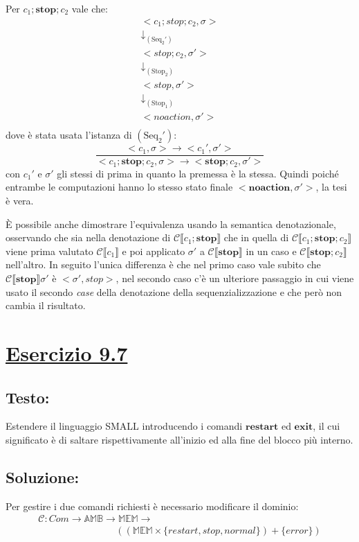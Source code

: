 \documentclass[a4paper,twosides]{report}
\newcommand{\sectionline}{
  \begin{center}
    \resizebox{0.5\linewidth}{5ex}{
      \begin{tikzpicture}
        \node  (C) at (0,0) {};
        \node (D) at (10,0) {};
        \path (C) to [ornament=84] (D);
      \end{tikzpicture}
    }
  \end{center}
}
\begin{document}
Per $c_1;\mathbf{stop};c_2$ vale che:
\begin{gather*}
  <c_1;stop;c_2,\sigma>\\
  \downarrow_{(\text{Seq}_2')}\\
  <stop;c_2,\sigma'>\\
  \downarrow_{(\text{Stop}_2)}\\
  <stop,\sigma'>\\
  \downarrow_{(\text{Stop}_1)}\\
  <noaction,\sigma'>\\
\end{gather*}
dove \`e stata usata l'istanza di $(\text{Seq}_2')$:
$$
\frac{<c_1,\sigma> \longrightarrow{}
  <c_1',\sigma'>}{<c_1;\mathbf{stop};c_2,\sigma> \longrightarrow{}
  <\mathbf{stop};c_2,\sigma'>}
$$
con $c_1'$ e $\sigma'$ gli stessi di prima in quanto la premessa è la
stessa. Quindi poich\'e entrambe le computazioni hanno lo stesso stato
finale $<\mathbf{noaction},\sigma'>$, la tesi
\`e vera.

\`E possibile anche dimostrare l'equivalenza usando la semantica
denotazionale, osservando che sia nella denotazione di $\mathcal{C}\llbracket
c_1;\mathbf{stop}\rrbracket$ che in quella di $\mathcal{C}\llbracket
c_1;\mathbf{stop};c_2\rrbracket$ viene prima valutato $\mathcal{C}\llbracket
c_1\rrbracket$ e poi applicato $\sigma'$ a $\mathcal{C}\llbracket
\mathbf{stop}\rrbracket$ in un caso e $\mathcal{C}\llbracket
\mathbf{stop};c_2\rrbracket$ nell'altro. In seguito l'unica differenza
\`e che nel primo caso vale subito che $\mathcal{C}\llbracket
\mathbf{stop}\rrbracket\sigma'$ \`e $<\sigma',stop>$, nel secondo caso
c'è un ulteriore passaggio in cui viene usato il secondo \emph{case}
della denotazione della sequenzializzazione e che per\`o non cambia il
risultato.

\sectionline
\section*{\hyperref[toc]{Esercizio 9.7}}
\subsection*{Testo:} Estendere il linguaggio SMALL introducendo i
comandi $\mathbf{restart}$ ed $\mathbf{exit}$, il cui significato è di 
saltare rispettivamente all’inizio ed alla fine del blocco più
interno.

\subsection*{Soluzione:} Per gestire i due comandi richiesti \`e
necessario modificare il dominio:
\begin{equation*}
  \begin{multlined}  
    \mathcal{C}:Com \longrightarrow{} \mathbb{AMB}
    \longrightarrow{} \mathbb{MEM} \longrightarrow{}\\
    \qquad\qquad\qquad\qquad((\mathbb{MEM}\times\{restart, stop, normal\})+\{error\})
  \end{multlined}  
\end{equation*}
\end{document}

